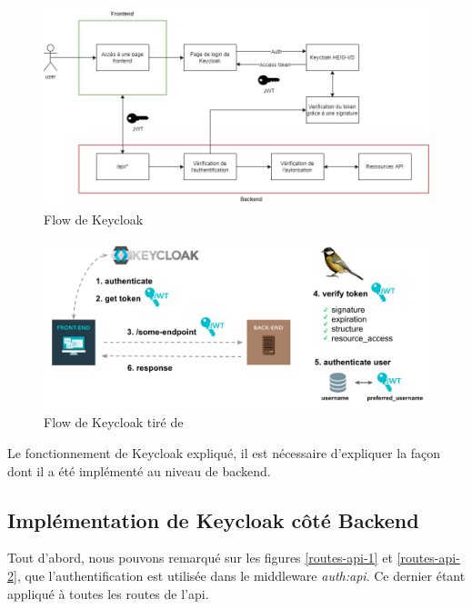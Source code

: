 \documentclass[
    iai, %
    il, %
]{heig-tb}
\begin{document}
\begin{center}
    \begin{figure}
        \includegraphics[width=\textwidth]{./assets/figures/keycloak-flow.drawio.png}
        \caption{Flow de Keycloak \label{keycloak-flow.drawio}}
    \end{figure}
\end{center}

\begin{center}
    \begin{figure}
        \includegraphics[width=\textwidth]{./assets/figures/keycloak-flow-lib.png}
        \caption{Flow de Keycloak tiré de \label{keycloak-flow-lib}}
    \end{figure}
\end{center}


Le fonctionnement de Keycloak expliqué, il est nécessaire d'expliquer la façon dont il a été implémenté au niveau de \Gls{backend}.

\subsection{Implémentation de Keycloak côté Backend}
Tout d'abord, nous pouvons remarqué sur les figures \ref{routes-api-1} et \ref{routes-api-2}, que l'authentification est utilisée dans le middleware \emph{auth:api}. Ce dernier étant appliqué à toutes les routes de l'\Gls{api}.
\end{document}
